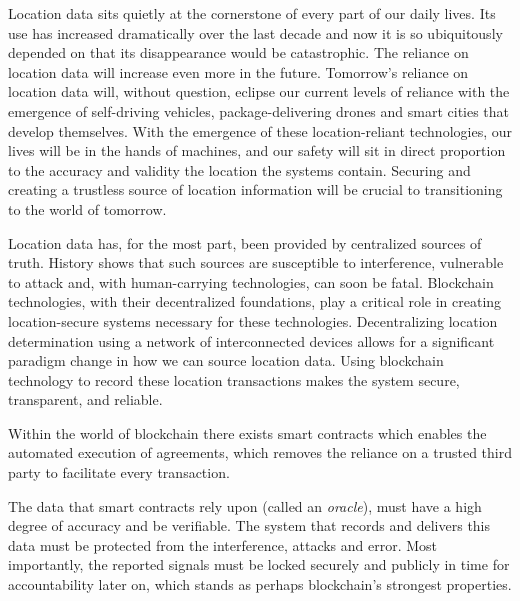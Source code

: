 \documentclass{article}
\begin{document}
Location data sits quietly at the cornerstone of every part of our daily lives. Its use has increased dramatically over the last decade and now it is so ubiquitously depended on that its disappearance would be catastrophic. The reliance on location data will increase even more in the future. Tomorrow's reliance on location data will, without question, eclipse our current levels of reliance with the emergence of self-driving vehicles, package-delivering drones and smart cities that develop themselves. With the emergence of these location-reliant technologies, our lives will be in the hands of machines, and our safety will sit in direct proportion to the accuracy and validity the location the systems contain. Securing and creating a trustless source of location information will be crucial to transitioning to the world of tomorrow.

Location data has, for the most part, been provided by centralized sources of truth. History shows that such sources are susceptible to interference, vulnerable to attack and, with human-carrying technologies, can soon be fatal. Blockchain technologies, with their decentralized foundations, play a critical role in creating location-secure systems necessary for these technologies. Decentralizing location determination using a network of interconnected devices allows for a significant paradigm change in how we can source location data. Using blockchain technology to record these location transactions makes the system secure, transparent, and reliable. 

Within the world of blockchain there exists smart contracts which enables the automated execution of agreements, which removes the reliance on a trusted third party to facilitate every transaction. 

The data that smart contracts rely upon (called an \textit{oracle}), must have a high degree of accuracy and be verifiable. The system that records and delivers this data must be protected from the interference, attacks and error. Most importantly, the reported signals must be locked securely and publicly in time for accountability later on, which stands as perhaps blockchain's strongest properties.
\end{document}
